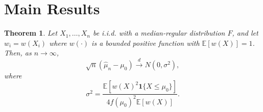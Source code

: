 \documentclass[12pt]{article}
\newtheorem{theorem}{Theorem}
\begin{document}
\section{Main Results}

\begin{theorem}\label{thm:main}
Let $X_1, \ldots, X_n$ be i.i.d. with a median-regular distribution $F$, and let $w_i = w(X_i)$ where $w(\cdot)$ is a bounded positive function with $\mathbb{E}[w(X)] = 1$. Then, as $n \to \infty$,
\begin{equation}
    \sqrt{n}(\hat{\mu}_n - \mu_0) \xrightarrow{d} N\left(0, \sigma^2\right),
\end{equation}
where
\begin{equation}
    \sigma^2 = \frac{\mathbb{E}[w(X)^2 \mathbf{1}\{X \leq \mu_0\}]}{4 f(\mu_0)^2 \mathbb{E}[w(X)]}.
\end{equation}
\end{theorem}
\end{document}
